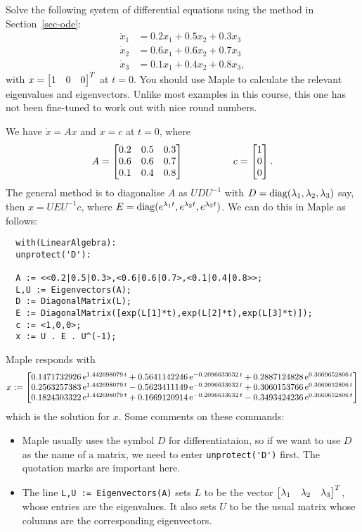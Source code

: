 \documentclass[a4paper]{amsart}
\renewenvironment{solution}{\SolutionInline}{\endSolutionInline}
\begin{document}
\begin{exercise}\label{ex-ode-i}
 Solve the following system of differential equations using the method
 in Section~\ref{sec-ode}:
 \begin{align*}
  \dot{x}_1 &= 0.2 x_1 + 0.5 x_2 + 0.3 x_3 \\
  \dot{x}_2 &= 0.6 x_1 + 0.6 x_2 + 0.7 x_3 \\
  \dot{x}_3 &= 0.1 x_1 + 0.4 x_2 + 0.8 x_3,
 \end{align*}
 with $x=\left[\begin{matrix} 1 & 0 & 0 \end{matrix}\right]^T$ at $t=0$.  You should use Maple to
 calculate the relevant eigenvalues and eigenvectors.  Unlike most
 examples in this course, this one has not been fine-tuned to work out
 with nice round numbers.
\end{exercise}
\begin{solution}
 We have $\dot{x}=Ax$ and $x=c$ at $t=0$, where 
 \[ A = \left[\begin{matrix} 0.2 & 0.5 & 0.3 \\
             0.6 & 0.6 & 0.7 \\
             0.1 & 0.4 & 0.8 \end{matrix}\right] 
    \hspace{5em}
    c = \left[\begin{matrix} 1 \\ 0 \\ 0 \end{matrix}\right].
 \]
 The general method is to diagonalise $A$ as $UDU^{-1}$ with
 $D=\operatorname{diag}(\lambda_1,\lambda_2,\lambda_3)$ say, then $x=UEU^{-1}c$, where
 $E=\operatorname{diag}(e^{\lambda_1 t},e^{\lambda_2 t},e^{\lambda_3 t})$.  We can do this in
 Maple as follows:
 \begin{verbatim}
  with(LinearAlgebra):
  unprotect('D'):

  A := <<0.2|0.5|0.3>,<0.6|0.6|0.7>,<0.1|0.4|0.8>>;
  L,U := Eigenvectors(A);
  D := DiagonalMatrix(L);
  E := DiagonalMatrix([exp(L[1]*t),exp(L[2]*t),exp(L[3]*t)]);
  c := <1,0,0>;
  x := U . E . U^(-1);
 \end{verbatim}
 Maple responds with 
 \[ x := 
     \left[\begin{matrix} 
      0.1471732926\,{{\rm e}^{ 1.442698079\,t}}+
      0.5641142246\,{{\rm e}^{-0.2096633632\,t}}+ 
      0.2887124828\,{{\rm e}^{ 0.3669652806\,t}} \\ 
      0.2563257383\,{{\rm e}^{ 1.442698079\,t}}
    - 0.5623411149\,{{\rm e}^{-0.2096633632\,t}} +
      0.3060153766\,{{\rm e}^{ 0.3669652806\,t}}\\
      0.1824303322\,{{\rm e}^{ 1.442698079\,t}}+
      0.1669120914\,{{\rm e}^{-0.2096633632\,t}}
    - 0.3493424236\,{{\rm e}^{ 0.3669652806\,t}}
     \end{matrix}\right]
 \]
 which is the solution for $x$.  Some comments on these commands:
 \begin{itemize}
  \item Maple usually uses the symbol $D$ for differentiataion, so if
   we want to use $D$ as the name of a matrix, we need to enter
   \verb+unprotect('D')+ first.  The quotation marks are important
   here.
  \item The line \verb+L,U := Eigenvectors(A)+ sets $L$ to be the
   vector $\left[\begin{matrix} \lambda_1 & \lambda_2 & \lambda_3\end{matrix}\right]^T$, whose entries are the
   eigenvalues.  It also sets $U$ to be the usual matrix whose columns
   are the corresponding eigenvectors.
 \end{itemize}
\end{solution}
\end{document}
